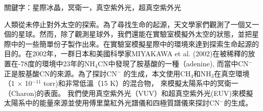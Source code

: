 \begin{abstractcn}

關鍵字：星際冰晶，冥衛一，真空紫外光，超真空紫外光
\vspace{2em}

人類從未停止對外太空的探索。為了尋找生命的起源，天文學家們觀測了一個又一個的星球。然而，除了觀測星球外，我們還能在實驗室模擬外太空的狀態，並把星際中的一些簡單份子製作出來。在實驗室模擬星際中的環境來達到探索生命起源的目的。在2002年，一群日本和美國科學家MIYAKAWA et al. (2002)\cite{miyakawa2002cold}在被稀釋的放置在-78度的環境中23年的NH$_4$CN中發現了胺基酸的一種（adenine), 而當中CN$^-$正是胺基酸CN的來源。為了探討CN$^-$ 的生成，本文使用CH$_4$和NH$_3$在真空環境（1 $\times$ 10$^{-11}$ torr)和非常低溫（15 K）的混合物， 來模擬太陽系中的冥衛一（Charon)的表面。 我們使用真空紫外光（VUV）和超真空紫外光(EUV)來模擬太陽系中的能量來源並使用傅里葉紅外光譜儀和四極質譜儀來探討CN$^-$的生成。

\end{abstractcn} 
